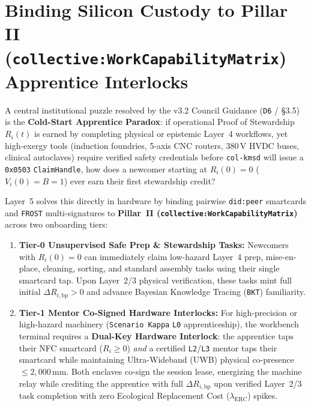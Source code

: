 \section{Binding Silicon Custody to Pillar II (\texttt{collective:WorkCapabilityMatrix}) Apprentice Interlocks}
\label{sec:ch2-pillar-two-interlocks}

A central institutional puzzle resolved by the v3.2 Council Guidance (\texttt{D6} / \S3.5) is the
\textbf{Cold-Start Apprentice Paradox}: if operational Proof of Stewardship $R_i(t)$ is earned by
completing physical or epistemic Layer~4 workflows, yet high-exergy tools (induction foundries,
5-axis CNC routers, $380\,\mathrm{V}$ HVDC buses, clinical autoclaves) require verified safety
credentials before \texttt{col-kmsd} will issue a \texttt{0x0503} \texttt{ClaimHandle}, how does a
newcomer starting at $R_i(0) = 0$ ($V_i(0) = B = 1$) ever earn their first stewardship credit?

Layer~5 solves this directly in hardware by binding pairwise \texttt{did:peer} smartcards and
\texttt{FROST} multi-signatures to \textbf{Pillar~II (\texttt{collective:WorkCapabilityMatrix})}
across two onboarding tiers:
\begin{enumerate}
\item \textbf{Tier-0 Unsupervised Safe Prep \& Stewardship Tasks:} Newcomers with $R_i(0) = 0$ can
        immediately claim low-hazard Layer~4 prep, mise-en-place, cleaning, sorting, and standard
        assembly tasks using their single smartcard tap. Upon Layer~2/3 physical verification,
        these tasks mint full initial $\Delta R_{i,\mathrm{bp}} > 0$ and advance Bayesian Knowledge
        Tracing (\texttt{BKT}) familiarity.
\item \textbf{Tier-1 Mentor Co-Signed Hardware Interlocks:} For high-precision or high-hazard
        machinery (\texttt{Scenario Kappa} \texttt{L0} apprenticeship), the workbench terminal
        requires a \textbf{Dual-Key Hardware Interlock}: the apprentice taps their NFC smartcard
        ($R_i \ge 0$) \textit{and} a certified \texttt{L2}/\texttt{L3} mentor taps their smartcard
        while maintaining Ultra-Wideband (UWB) physical co-presence $\le 2{,}000\,\mathrm{mm}$.
        Both enclaves co-sign the session lease, energizing the machine relay while crediting the
        apprentice with full $\Delta R_{i,\mathrm{bp}}$ upon verified Layer~2/3 task completion
        with zero Ecological Replacement Cost ($\lambda_{\mathrm{ERC}}$) spikes.
\end{enumerate}

